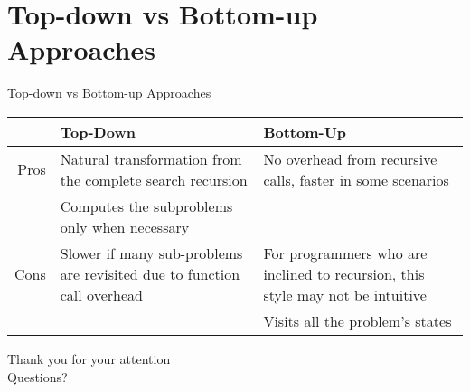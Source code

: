 \section{Top-down vs Bottom-up Approaches}


\begin{frame}{Top-down vs Bottom-up Approaches}
  \begin{tabular}{ r | p{5cm} | p{5cm}}
   & \textbf{Top-Down} & \textbf{Bottom-Up} \\
   \hline
   Pros & Natural transformation from the complete search recursion & No overhead from recursive calls, faster in some scenarios \\
        & Computes the subproblems only when necessary & \\
   \hline
   Cons & Slower if many sub-problems are revisited due to function call overhead & For programmers who are inclined to recursion, this style may not be intuitive \\
        &                                                                         & Visits all the problem's states \\
  \end{tabular}
\end{frame}


\begin{frame}
  Thank you for your attention
  \\
  \vspace{5em}
  Questions?  
\end{frame}